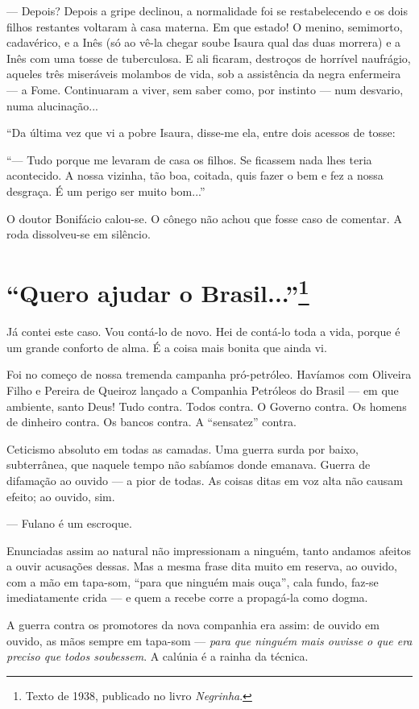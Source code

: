 --- Depois? Depois a gripe declinou, a normalidade foi se restabelecendo
e os dois filhos restantes voltaram à casa materna. Em que estado! O
menino, semimorto, cadavérico, e a Inês (só ao vê-la chegar soube Isaura
qual das duas morrera) e a Inês com uma tosse de tuberculosa. E ali
ficaram, destroços de horrível naufrágio, aqueles três miseráveis
molambos de vida, sob a assistência da negra enfermeira --- a Fome.
Continuaram a viver, sem saber como, por instinto --- num desvario, numa
alucinação...

``Da última vez que vi a pobre Isaura, disse-me ela, entre dois acessos
de tosse:

``--- Tudo porque me levaram de casa os filhos. Se ficassem nada lhes
teria acontecido. A nossa vizinha, tão boa, coitada, quis fazer o bem e
fez a nossa desgraça. É um perigo ser muito bom...''

O doutor Bonifácio calou-se. O cônego não achou que fosse caso de
comentar. A roda dissolveu-se em silêncio.

\chapter{``Quero ajudar o Brasil...''\footnote[*]{Texto de 1938, publicado no livro \emph{Negrinha}.}}

Já contei este caso. Vou contá-lo de novo. Hei de contá-lo toda a vida,
porque é um grande conforto de alma. É a coisa mais bonita que ainda vi.

Foi no começo de nossa tremenda campanha pró-petróleo. Havíamos com
Oliveira Filho e Pereira de Queiroz lançado a Companhia Petróleos do
Brasil --- em que ambiente, santo Deus! Tudo contra. Todos contra. O
Governo contra. Os homens de dinheiro contra. Os bancos contra. A
``sensatez'' contra.

Ceticismo absoluto em todas as camadas. Uma guerra surda por baixo,
subterrânea, que naquele tempo não sabíamos donde emanava. Guerra de
difamação ao ouvido --- a pior de todas. As coisas ditas em voz alta não
causam efeito; ao ouvido, sim.

--- Fulano é um escroque.

Enunciadas assim ao natural não impressionam a ninguém, tanto andamos
afeitos a ouvir acusações dessas. Mas a mesma frase dita muito em
reserva, ao ouvido, com a mão em tapa-som, ``para que ninguém mais
ouça'', cala fundo, faz-se imediatamente crida --- e quem a recebe corre
a propagá-la como dogma.

A guerra contra os promotores da nova companhia era assim: de ouvido em
ouvido, as mãos sempre em tapa-som --- \emph{para que ninguém mais
ouvisse o que era preciso que todos soubessem}. A calúnia é a rainha da
técnica.

